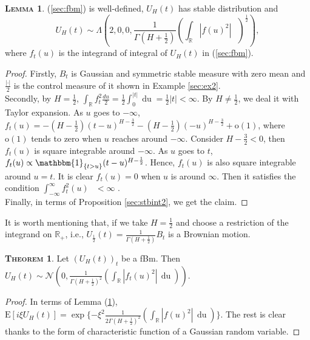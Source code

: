 \documentclass[a4paper, twoside, 11pt]{article}
\theoremstyle{definition}
\newtheorem{theorem}[definition]{\scshape Theorem}
\newtheorem{lemma}[definition]{\scshape Lemma}
\begin{document}
  \begin{lemma}
	(\ref{sec:fbm}) is well-defined, $U_H(t)$ has stable distribution and 
	\begin{equation*}
	  U_H(t) \sim \Lambda(2, 0, 0, \frac{1}{\Gamma(H+\frac{1}{2})}(\int_{\mathbb{R}} |f(u)^2|\, \mathop{\frac{du}{2}})^\frac{1}{2}),
	\end{equation*}
	where $f_t(u)$ is the integrand of integral of $U_H(t)$ in (\ref{sec:fbm}).
	\label{sec:l2}
  \end{lemma}
  \begin{proof}
	Firstly, $B_t$ is Gaussian and symmetric stable measure with zero mean and $\frac{|\cdot|}{2}$ is the control measure of it shown in Example \ref{sec:ex2}. \\
	Secondly, by $H=\frac{1}{2}$, $\int_{\mathbb{R}} f_t^2\frac{du}{2} = \frac{1}{2}\int_{0}^{|t|} \mathop{du} = \frac{1}{2}|t| < \infty$. By $H \neq \frac{1}{2}$, we deal it with Taylor expansion. As $u$ goes to $-\infty$, $f_t(u) = -(H-\frac{1}{2})(t-u)^{H-\frac{3}{2}}-(H-\frac{1}{2})(-u)^{H-\frac{3}{2}} + \mathrm{o}(1)$, where $\mathrm{o}(1)$ tends to zero when $u$ reaches around $-\infty$. Consider $H-\frac{3}{2} < 0$, then $f_t(u)$ is square integrable around $-\infty$. As $u$ goes to $t$, $f_t(u) \propto \mathbbm{1}_{\{t > u\}}(t-u)^{H-\frac{1}{2}}$. Hence, $f_t(u)$ is also square integrable around $u=t$. It is clear $f_t(u)=0$ when $u$ is around $\infty$. Then it satisfies the condition $\int_{-\infty}^{\infty}f_t^2(u)\,\mathop{\frac{du}{2}} < \infty$ .\\
	Finally, in terms of Proposition \ref{sec:stbint2}, we get the claim.
  \end{proof}
  It is worth mentioning that, if we take $H=\frac{1}{2}$ and choose a restriction of the integrand on $\mathbb{R}_+$, i.e., $U_{\frac{1}{2}}(t) = \frac{1}{\Gamma(H+\frac{1}{2})} B_t$ is a Brownian motion. 	
  \begin{theorem}
	Let $(U_H(t))_t$ be a fBm. Then $U_H(t) \sim \mathcal{N}(0, \frac{1}{\Gamma(H+\frac{1}{2})^2}(\int_{\mathbb{R}} |f_t(u)^2|\, \mathop{du}))$.
	\label{sec:the1}
  \end{theorem}
  \begin{proof}
	In terms of Lemma (\ref{sec:l2}), $\mathrm{E}[i\xi U_H(t)] = \exp\{-\xi^2 \frac{1}{2\Gamma(H+\frac{1}{2})^2}(\int_{\mathbb{R}} |f(u)^2|\, \mathop{du})\}$. The rest is clear thanks to the form of characteristic function of a Gaussian random variable.
  \end{proof}
\end{document}
